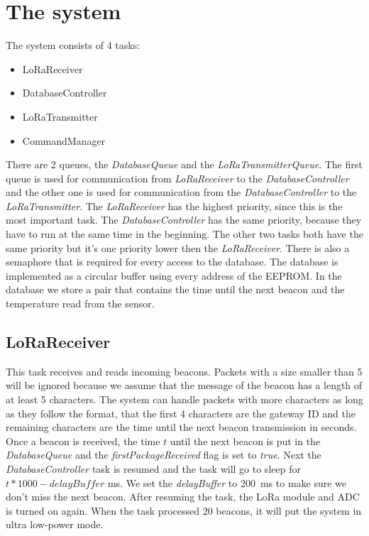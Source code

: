 \documentclass{scrartcl}
\begin{document}


\pagestyle{scrheadings}
\clearscrheadfoot

\cfoot{\pagemark}

\newpage

\section{The system}
The system consists of 4 tasks:
\begin{itemize}
    \item LoRaReceiver
    \item DatabaseController
    \item LoRaTransmitter
    \item CommandManager
\end{itemize}

There are 2 queues, the \textit{DatabaseQueue} and the \textit{LoRaTransmitterQueue}.
The first queue is used for communication from \textit{LoRaReceiver} to the \textit{DatabaseController} and the
other one is used for communication from the \textit{DatabaseController} to the \textit{LoRaTransmitter}.
The \textit{LoRaReceiver} has the highest priority, since this is the most important task.
The \textit{DatabaseController} has the same priority, because they have to run at the same time in the beginning.
The other two tasks both have the same priority but it's one priority lower then the \textit{LoRaReceiver}.
There is also a semaphore that is required for every access to the database.
The database is implemented as a circular buffer using every address of the EEPROM.
In the database we store a pair that contains the time until the next beacon and the temperature read from the sensor.

\subsection{LoRaReceiver}
This task receives and reads incoming beacons. Packets with a size smaller than 5 will be ignored because
we assume that the message of the beacon has a length of at least 5 characters. The system can handle packets with more characters
as long as they follow the format, that the first 4 characters are the gateway ID and the remaining characters are the time until the
next beacon transmission in seconds. Once a beacon is received, the time $t$ until the next beacon is put in the \textit{DatabaseQueue} and
the \textit{firstPackageReceived} flag is set to \textit{true}.
Next the \textit{DatabaseController} task is resumed and the task will go to sleep for $t*1000 - \textit{delayBuffer}$ \si{\milli\second}.
We set the \textit{delayBuffer} to \SI{200}{\milli\second} to make sure we don't miss the next beacon.
After resuming the task, the LoRa module and ADC is turned on again.
When the task processed 20 beacons, it will put the system in ultra low-power mode.
\end{document}
